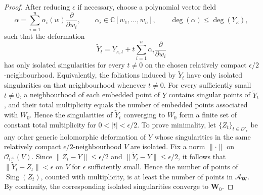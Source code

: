 \documentclass[10pt,a4paper]{amsart}
\DeclareMathOperator{\sing}{Sing}
\newcommand{\C}{\mathbb{C}}
\newcommand{\W}{\mathbf{W}}
\newcommand{\oo}{\mathcal{O}}
\begin{document}
\begin{proof}
After reducing $\epsilon$ if necessary, choose a polynomial vector field
\[
\alpha=\sum_{i=1}^n \alpha_i(w)\frac{\partial}{\partial w_i},
\qquad
\alpha_i\in \C[w_1,\ldots,w_n],
\qquad
\deg(\alpha)\leq \deg(Y_\kappa),
\]
such that the deformation
\begin{equation}\label{eq:principal-deformation}
\widetilde{Y}_t
=
Y_{\kappa,t}+t\sum_{i=1}^n \alpha_i \frac{\partial}{\partial w_i}
\end{equation}
has only isolated singularities for every $t\ne 0$ on the chosen relatively compact $\epsilon/2$-neighbourhood.
Equivalently, the foliations induced by $\widetilde{Y}_t$ have only isolated singularities on that neighbourhood whenever $t\ne 0$.
For every sufficiently small $t\neq0$, a neighbourhood of each embedded point of $Y$ contains singular points of $\widetilde Y_t$, and their total multiplicity equals the number of embedded points associated with $W_0$. Hence the singularities of $\widetilde Y_t$ converging to $W_0$ form a finite set of constant total multiplicity for $0<|t|<\epsilon/2$.
To prove minimality, let $\{Z_t\}_{t\in D'_\epsilon}$ be any other generic holomorphic deformation of $Y$ whose singularities in the same relatively compact $\epsilon/2$-neighbourhood $V$ are isolated.
Fix a norm $\|\cdot\|$ on $\oo_{\C^n}(V)$.
Since $\|Z_t-Y\|\leq \epsilon/2$ and $\|\widetilde{Y}_t-Y\|\leq \epsilon/2$, it follows that
$\|\widetilde{Y}_t-Z_t\|<\epsilon$ on $V$ for $\epsilon$ sufficiently small.
Hence the number of points of $\sing(Z_t)$, counted with multiplicity, is at least the number of points in $\mathcal A_{\W}$. By continuity, the corresponding isolated singularities converge to $\W_0$.
\end{proof}
\end{document}
